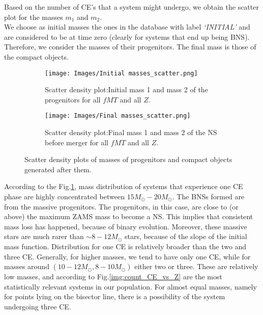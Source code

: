 \documentclass[preprint,12pt]{elsarticle}
\begin{document}
Based on the number of CE's that a system might undergo, we obtain the scatter plot for the masses $m_1$ and $m_2$.\\
We choose as initial masses the ones in the database with label \textit{`INITIAL'} and are considered to be at time zero (clearly for systems that end up being BNS). Therefore, we consider the masses of their progenitors. The final mass is those of the compact objects.

\begin{figure}[ht]
    \begin{subfigure}[t]{1\textwidth}
      \centering
      \texttt{[image: Images/Initial masses\_scatter.png]}
      \caption{Scatter density plot:Initial mass 1 and mass 2 of the progenitors for all $fMT$ and all $Z$.}
    \label{img:scatter_initial}
    \end{subfigure}
    \begin{subfigure}[t]{1\textwidth}
      \centering
      \texttt{[image: Images/Final masses\_scatter.png]}
      \caption{Scatter density plot:Final mass 1 and mass 2 of the NS before merger for all $fMT$ and all $Z$.}
    \label{img:scatter_final}
    \end{subfigure}
    \caption{Scatter density plots of masses of progenitors and compact objects generated after them.}
    \label{img:scatter_plots}
 \end{figure}

According to the Fig.\ref{img:scatter_initial}, mass distribution of systems that experience one CE phase are highly concentrated between $15 M_\odot-20 M_\odot$. The BNSs formed are from the massive progenitors. The progenitors, in this case, are close to (or above) the maximum ZAMS mass to become a NS. This implies that consistent mass loss has happened, because of binary evolution. Moreover, these massive stars are much rarer than $\sim 8-12 M_{\odot}$ stars, because of the slope of the initial mass function. Distribution for one CE is relatively broader than the two and three CE. Generally, for higher masses, we tend to have only one CE, while for masses around $(10-12 M_\odot, 8-10 M_\odot)$ either two or three. These are relatively low masses, and according to Fig.\ref{img:count_CE_vs_Z} are the most statistically relevant systems in our population\citep{Kroupa:2001, Salpeter:1955}. For almost equal masses, namely for points lying on the bisector line, there is a possibility of the system undergoing three CE.\\
\end{document}
